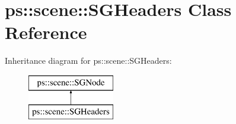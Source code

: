 \hypertarget{classps_1_1scene_1_1SGHeaders}{}\section{ps\+:\+:scene\+:\+:S\+G\+Headers Class Reference}
\label{classps_1_1scene_1_1SGHeaders}
Inheritance diagram for ps\+:\+:scene\+:\+:S\+G\+Headers\+:\begin{figure}[H]
\begin{center}
\leavevmode
\includegraphics[height=2.000000cm]{classps_1_1scene_1_1SGHeaders}
\end{center}
\end{figure}
